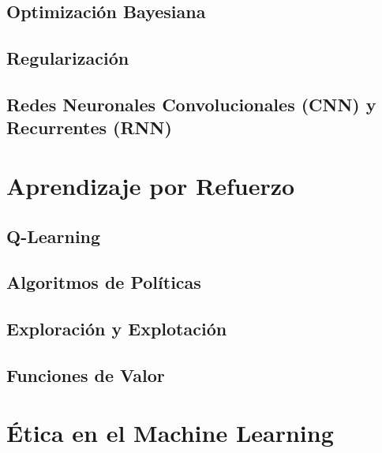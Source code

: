 \documentclass[12pt]{article}
\begin{document}
\subsection{Optimización Bayesiana}
\newpage
\subsection{Regularización}
\newpage
\subsection{Redes Neuronales Convolucionales (CNN) y Recurrentes (RNN)}
\newpage
\section{Aprendizaje por Refuerzo}

\subsection{Q-Learning}
\newpage
\subsection{Algoritmos de Políticas}
\newpage
\subsection{Exploración y Explotación}
\newpage
\subsection{Funciones de Valor}
\newpage
\section{Ética en el Machine Learning}
\end{document}
